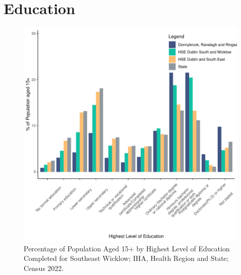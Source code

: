 \documentclass{article}
\begin{document}
\section{Education}\label{sect:Edu}
\begin{figure}[H]
	\centering
	\includegraphics[width = 120mm]{../figures/EduED.pdf}
	\caption{Percentage of Population Aged 15+ by Highest Level of Education Completed for Southeast Wicklow; IHA, Health Region and State; Census 2022.}
	\label{fig:vbnv}
	\end{figure}
\end{document}
